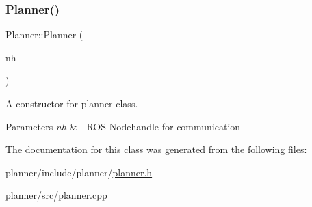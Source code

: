 \subsubsection{\texorpdfstring{Planner()}{Planner()}}
{\footnotesize\ttfamily Planner\+::\+Planner (\begin{DoxyParamCaption}\item[{ros\+::\+Node\+Handle \&}]{nh }\end{DoxyParamCaption})\hspace{0.3cm}{\ttfamily [explicit]}}



A constructor for planner class. 


\begin{DoxyParams}{Parameters}
{\em nh} & -\/ R\+OS Nodehandle for communication \\
\hline
\end{DoxyParams}


The documentation for this class was generated from the following files\+:\begin{DoxyCompactItemize}
\item 
planner/include/planner/\hyperlink{planner_8h}{planner.\+h}\item 
planner/src/planner.\+cpp\end{DoxyCompactItemize}
